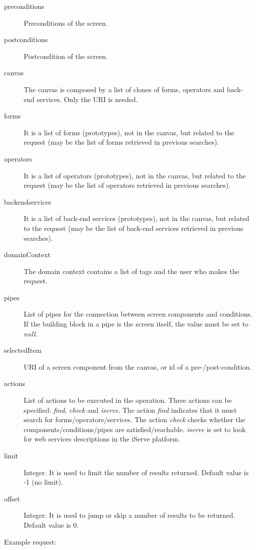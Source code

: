 \documentclass{fast_latex}
\begin{document}
\begin{description}
	\item[preconditions] Preconditions of the screen.
	\item[postconditions] Postcondition of the screen.
	\item[canvas] The canvas is composed by a list of clones of forms, operators and back-end services. Only the URI is needed.
	\item[forms] It is a list of forms (prototypes), not in the canvas, but related to the request (may be the list of forms retrieved in previous searches).
	\item[operators] It is a list of operators (prototypes), not in the canvas, but related to the request (may be the list of operators retrieved in previous searches).
	\item[backendservices] It is a list of back-end services (prototypes), not in the canvas, but related to the request (may be the list of back-end services retrieved in previous searches).
	\item[domainContext] The domain context contains a list of tags and the user who makes the request.
	\item[pipes] List of pipes for the connection between screen components and conditions. If the building block in a pipe is the screen itself, the value must be set to \emph{null}.
	\item[selectedItem] URI of a screen component from the canvas, or id of a pre-/post-condition.
	\item[actions] List of actions to be executed in the operation. Three actions can be specified: \emph{find}, \emph{check} and \emph{iserve}. The action \emph{find} indicates that it must search for forms/operators/services. The action \emph{check} checks whether the components/conditions/pipes are satisfied/reachable. \emph{iserve} is set to look for web services descriptions in the iServe platform.
	\item[limit] Integer. It is used to limit the number of results returned. Default value is -1 (no limit).
	\item[offset] Integer. It is used to jump or skip a number of results to be returned. Default value is 0.
\end{description}

Example request:
\end{document}

